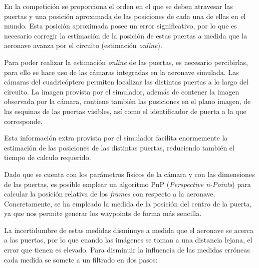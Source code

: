 En la competición se proporciona el orden en el que se deben atravesar las puertas y una posición aproximada de las posiciones de cada una de ellas en el mundo. Esta posición aproximada posee un error significativo, por lo que es necesario corregir la estimación de la posición de estas puertas a medida que la aeronave avanza por el circuito (estimación \textit{online}).

Para poder realizar la estimación \textit{online} de las puertas, es necesario percibirlas, para ello se hace uso de las cámaras integradas en la aeronave simulada. Las cámaras del cuadricóptero permiten localizar las distintas puertas a lo largo del circuito. La imagen provista por el simulador, además de contener la imagen observada por la cámara, contiene también las posiciones en el plano imagen, de las esquinas de las puertas visibles, así como el identificador de puerta a la que corresponde.


Esta información extra provista por el simulador facilita enormemente la estimación de las posiciones de las distintas puertas, reduciendo también el tiempo de calculo requerido.



Dado que se cuenta con los parámetros físicos de la cámara y con las dimensiones de las puertas, es posible emplear un algoritmo PnP (\textit{Perspective n-Points}) para calcular la posición relativa de los \textit{frames} con respecto a la aeronave. Concretamente, se ha empleado la medida de la posición del centro de la puerta, ya que nos permite generar los waypoints de forma más sencilla.






La incertidumbre de estas medidas disminuye a medida que el aeronave se acerca a las puertas, por lo que cuando las imágenes se toman a una distancia lejana, el error que tienen es elevado. Para disminuir la influencia de las medidas erróneas cada medida se somete a un filtrado en dos pasos:

